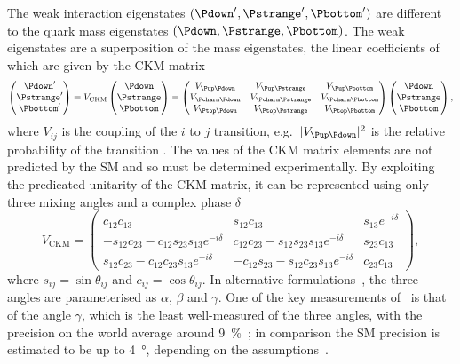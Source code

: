 The weak interaction eigenstates $(\Pdown', \Pstrange', \Pbottom')$ are 
different to the quark mass eigenstates $(\Pdown, \Pstrange, \Pbottom)$.
The weak eigenstates are a superposition of the mass eigenstates, the linear 
coefficients of which are given by the \ac{CKM} matrix
\begin{equation}
  \begin{pmatrix} \Pdown' \\ \Pstrange' \\ \Pbottom' \end{pmatrix}
  =
  V_{\text{CKM}}\begin{pmatrix} \Pdown \\ \Pstrange \\ \Pbottom \end{pmatrix}
  =
  \begin{pmatrix}
    \Vud & \Vus & \Vub \\
    \Vcd & \Vcs & \Vcb \\
    \Vtd & \Vts & \Vtb
  \end{pmatrix}
  \begin{pmatrix} \Pdown \\ \Pstrange \\ \Pbottom \end{pmatrix},
\end{equation}
where $V_{ij}$ is the coupling of the $i$ to $j$ transition, e.g.\ $|\Vud|^{2}$ 
is the relative probability of the transition \decay{\Pdown}{\Pup}.
The values of the \ac{CKM} matrix elements are not predicted by the \ac{SM} and 
so must be determined experimentally.
By exploiting the predicated unitarity of the \ac{CKM} matrix, it can be 
represented using only three mixing angles and a complex phase $\delta$
\begin{equation}
  V_{\textrm{CKM}} =
  \begin{pmatrix}
    c_{12}c_{13} & s_{12}c_{13} & s_{13}e^{-i\delta} \\
    -s_{12}c_{23} - c_{12}s_{23}s_{13}e^{-i\delta} & c_{12}c_{23} - 
    s_{12}s_{23}s_{13}e^{-i\delta} & s_{23}c_{13} \\
    s_{12}c_{23} - c_{12}c_{23}s_{13}e^{-i\delta} & -c_{12}s_{23} - 
    s_{12}c_{23}s_{13}e^{-i\delta} & c_{23}c_{13}
  \end{pmatrix},
\end{equation}
where $s_{ij} = \sin{\theta_{ij}}$ and $c_{ij} = \cos{\theta_{ij}}$.
In alternative formulations~\cite{Wolfenstein:1983yz}, the three angles are 
parameterised as $\alpha$, $\beta$ and $\gamma$.
One of the key measurements of \lhcb\ is that of the angle $\gamma$, which is 
the least well-measured of the three angles, with the precision on the world 
average around \SI{9}{\percent}~\cite{LHCb-CONF-2016-001}; in comparison the 
\ac{SM} precision is estimated to be up to \SI{4}{\degree}, depending on the 
assumptions~\cite{Brod:2013sga,Brod:2014bfa}.


